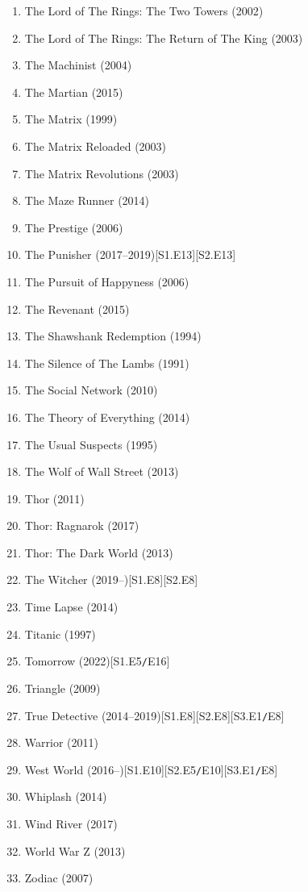 \documentclass{article}
\begin{document}
\begin{enumerate}
	\item {\sc The Lord of The Rings: The Two Towers} (2002)
	\item {\sc The Lord of The Rings: The Return of The King} (2003)
	\item {\sc The Machinist} (2004)
	\item {\sc The Martian} (2015)
	\item {\sc The Matrix} (1999)
	\item {\sc The Matrix Reloaded} (2003)
	\item {\sc The Matrix Revolutions} (2003)
	\item {\sc The Maze Runner} (2014)
	\item {\sc The Prestige} (2006)
	\item {\sc The Punisher} (2017--2019)\hfill[S1.E13][S2.E13]
	\item {\sc The Pursuit of Happyness} (2006)
	\item {\sc The Revenant} (2015)
	\item {\sc The Shawshank Redemption} (1994)
	\item {\sc The Silence of The Lambs} (1991)
	\item {\sc The Social Network} (2010)
	\item {\sc The Theory of Everything} (2014)
	\item {\sc The Usual Suspects} (1995)
	\item {\sc The Wolf of Wall Street} (2013)
	\item {\sc Thor} (2011)
	\item {\sc Thor: Ragnarok} (2017)
	\item {\sc Thor: The Dark World} (2013)
	\item The Witcher (2019--)\hfill[S1.E8][S2.E8]
	\item {\sc Time Lapse} (2014)
	\item {\sc Titanic} (1997)
	\item Tomorrow (2022)\hfill[S1.E5{\tt/}E16]
	\item {\sc Triangle} (2009)
	\item True Detective (2014--2019)\hfill[S1.E8][S2.E8][S3.E1{\tt/}E8]
	\item {\sc Warrior} (2011)
	\item West World (2016--)\hfill[S1.E10][S2.E5{\tt/}E10][S3.E1{\tt/}E8]
	\item {\sc Whiplash} (2014)
	\item {\sc Wind River} (2017)
	\item {\sc World War Z} (2013)
	\item {\sc Zodiac} (2007)
\end{enumerate}
\end{document}
